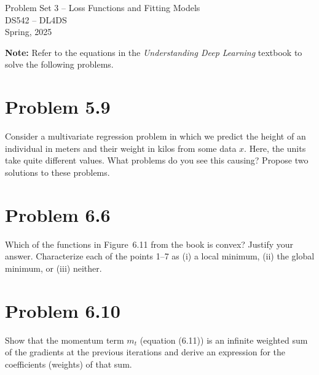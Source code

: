 \documentclass[10pt]{article}
\begin{document}
\begin{center}
    \LARGE {Problem Set 3 – Loss Functions and Fitting Models} \\[1em]
    \Large{DS542 – DL4DS} \\[0.5em]
    \large Spring, 2025
\end{center}

\vspace{2em}

\noindent\textbf{Note:} Refer to the equations in the \textit{Understanding Deep Learning} textbook to solve the following problems.

\vspace{2em}

\section*{Problem 5.9}
Consider a multivariate regression problem in which we predict the height of an individual in meters and their weight in kilos from some data $x$. Here, the units take quite different values. What problems do you see this causing? Propose two solutions to these problems.

\vspace{5em}

\section*{Problem 6.6}
Which of the functions in Figure~6.11 from the book is convex? Justify your answer. Characterize each of the points 1--7 as (i) a local minimum, (ii) the global minimum, or (iii) neither.

\vspace{5em}

\section*{Problem 6.10}
Show that the momentum term \( m_t \) (equation (6.11)) is an infinite weighted sum of the gradients at the previous iterations and derive an expression for the coefficients (weights) of that sum.
\end{document}
